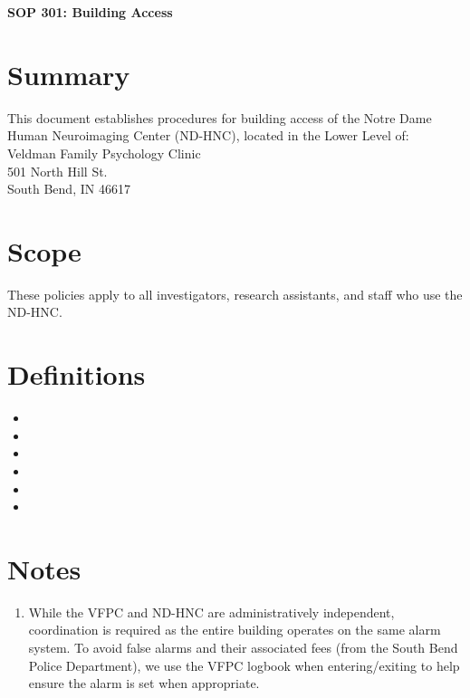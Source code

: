 \documentclass[11pt]{article}
\begin{document}
\renewcommand{\labelenumii}{\arabic{enumi}.\arabic{enumii}}
\renewcommand{\labelenumiii}{\arabic{enumi}.\arabic{enumii}.\arabic{enumiii}}
\renewcommand{\labelenumiv}{\arabic{enumi}.\arabic{enumii}.\arabic{enumiii}.\arabic{enumiv}}

\begin{center}
	\textbf{\Large SOP 301: Building Access}\\
	\hrulefill
\end{center}


\section{Summary}
This document establishes procedures for building access of the Notre Dame Human Neuroimaging Center (ND-HNC), located in the Lower Level of:\\

Veldman Family Psychology Clinic\\
501 North Hill St.\\
South Bend, IN 46617

\section{Scope}
These policies apply to all investigators, research assistants, and staff who use the ND-HNC.

\section{Definitions}

\begin{itemize}
	\item \ElectronicLock
	\item \Helper
	\item \Lead
	\item \NDHNC
	\item \VFPC
	\item \Visitor
\end{itemize}


\section{Notes}

\begin{enumerate}
	\item While the VFPC and ND-HNC are administratively independent, coordination is required as the entire building operates on the same alarm system. To avoid false alarms and their associated fees (from the South Bend Police Department), we use the VFPC logbook when entering/exiting to help ensure the alarm is set when appropriate.
\end{enumerate}
\end{document}
